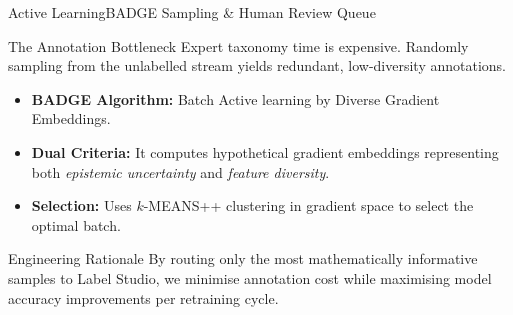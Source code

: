 \begin{frame}{Active Learning}{BADGE Sampling \& Human Review Queue}
    \begin{block}{The Annotation Bottleneck}
        Expert taxonomy time is expensive. Randomly sampling from the unlabelled stream yields redundant, low-diversity annotations.
        \begin{itemize}
            \item \textbf{BADGE Algorithm:} Batch Active learning by Diverse Gradient Embeddings.
            \item \textbf{Dual Criteria:} It computes hypothetical gradient embeddings representing both \textit{epistemic uncertainty} and \textit{feature diversity}.
            \item \textbf{Selection:} Uses $k$-MEANS++ clustering in gradient space to select the optimal batch.
        \end{itemize}
    \end{block}

    \begin{block}{Engineering Rationale}
        By routing only the most mathematically informative samples to Label Studio, we minimise annotation cost while maximising model accuracy improvements per retraining cycle.
    \end{block}

    \vspace{0.2cm}
    \statuspartial

\end{frame}

